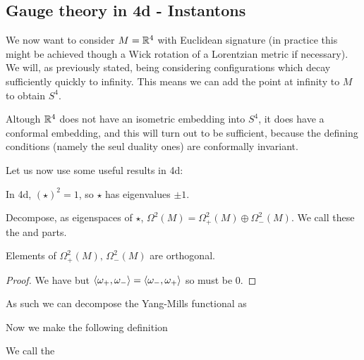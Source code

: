 \documentclass{article}
\begin{document}
\subsection{Gauge theory in 4d - Instantons}

We now want to consider $M=\mathbb{R}^4$ with Euclidean signature (in practice this might be achieved though a Wick rotation of a Lorentzian metric if necessary). We will, as previously stated, being considering configurations which decay sufficiently quickly to infinity. This means we can add the point at infinity to $M$ to obtain $S^4$.

\begin{remark}
	Altough $\mathbb{R}^4$ does not have an isometric embedding into $S^4$, it does have a conformal embedding, and this will turn out to be sufficient, because the defining conditions (namely the seul duality ones) are conformally invariant.  
\end{remark}

Let us now use some useful results in 4d: 

\begin{lemma}
	In 4d, $(\star)^2 = 1$, so $\star$ has eigenvalues $\pm 1$. 
\end{lemma}

\begin{definition}
	Decompose, as eigenspaces of $\star$, $\Omega^2(M) = \Omega^2_+(M) \oplus \Omega^2_-(M)$. We call these the  and  parts.
\end{definition}

\begin{lemma}
	Elements of $\Omega^2_+(M), \, \Omega^2_-(M)$ are orthogonal. 
\end{lemma}
\begin{proof}
	We have 
but $\left\langle \omega_+, \omega_- \right\rangle = \left\langle \omega_-, \omega_+ \right\rangle$ so must be 0. 
\end{proof}

As such we can decompose the Yang-Mills functional as 

Now we make the following definition
\begin{definition}
	We call 
the 
\end{definition}	
	
\end{document}
